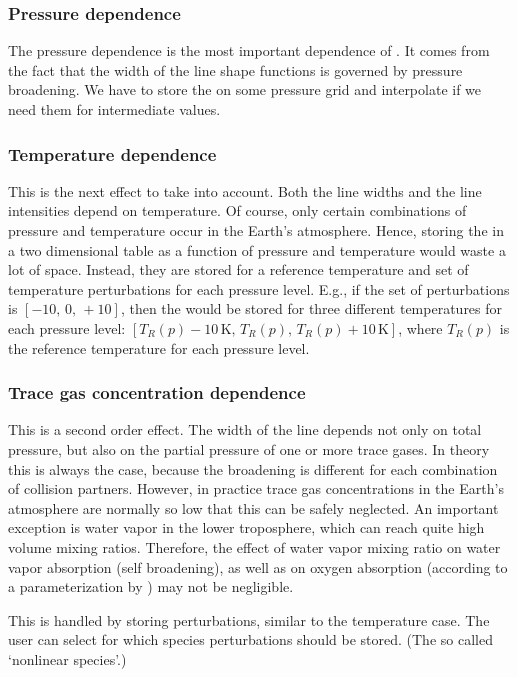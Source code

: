 \subsubsection{Pressure dependence}

The pressure dependence is the most important dependence of
\AbsXsec. It comes from the fact that the width of the line shape
functions is governed by pressure broadening. We have to store the
 on some pressure grid and interpolate if we need them for
intermediate values.

\subsubsection{Temperature dependence}

This is the next effect to take into account. Both the line widths and
the line intensities depend on temperature. Of course, only certain
combinations of pressure and temperature occur in the Earth's
atmosphere. Hence, storing the  in a two dimensional table
as a function of pressure and temperature would waste a lot of space.
Instead, they are stored for a reference temperature and set of
temperature perturbations for each pressure level. E.g., if the set of
perturbations is $[-10,\, 0,\, +10]$, then the  would be stored
for three different temperatures for each pressure level:
$[T_R(p)-10\,\mbox{K},\, T_R(p),\, T_R(p)+10\,\mbox{K}]$, where
$T_R(p)$ is the reference temperature for each pressure level.

\subsubsection{Trace gas concentration dependence}

This is a second order effect. The width of the line depends not only
on total pressure, but also on the partial pressure of one or more
trace gases. In theory this is always the case, because the broadening
is different for each combination of collision partners. However, in
practice trace gas concentrations in the Earth's atmosphere are
normally so low that this can be safely neglected. An important
exception is water vapor in the lower troposphere, which can reach
quite high volume mixing ratios. Therefore, the effect of water vapor
mixing ratio on water vapor absorption (self broadening), as well as
on oxygen absorption (according to a parameterization by
\citet{pwr:93}) may not be negligible.

This is handled by storing perturbations, similar to the temperature
case. The user can select for which species perturbations should be
stored. (The so called `nonlinear species'.)

